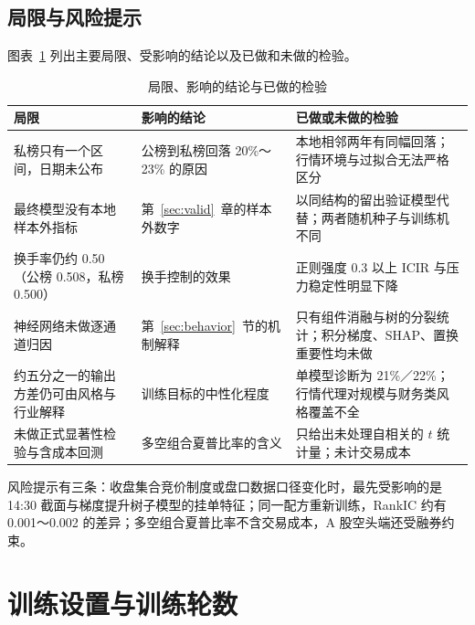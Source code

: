 \documentclass[UTF8,a4paper,zihao=-4,fontset=none]{ctexart}
\newcommand{\tabsetup}{\small\linespread{1.15}\selectfont\renewcommand{\arraystretch}{1.25}}
\newcommand{\figref}[1]{图表~\ref{#1}}
\begin{document}
\subsection{局限与风险提示}\label{sec:limits}

\figref{tab:limits} 列出主要局限、受影响的结论以及已做和未做的检验。

\begin{table}[htbp]
\caption{局限、影响的结论与已做的检验}\label{tab:limits}
\centering\tabsetup
\begin{tabularx}{\textwidth}{@{}>{\raggedright\arraybackslash\hsize=1.05\hsize}X>{\raggedright\arraybackslash\hsize=0.8\hsize}X>{\raggedright\arraybackslash\hsize=1.15\hsize}X@{}}
\toprule
局限 & 影响的结论 & 已做或未做的检验\\
\midrule
私榜只有一个区间，日期未公布 & 公榜到私榜回落 20\%～23\% 的原因 & 本地相邻两年有同幅回落；行情环境与过拟合无法严格区分\\
最终模型没有本地样本外指标 & 第~\ref{sec:valid}~章的样本外数字 & 以同结构的留出验证模型代替；两者随机种子与训练机不同\\
换手率仍约 0.50（公榜 0.508，私榜 0.500） & 换手控制的效果 & 正则强度 0.3 以上 ICIR 与压力稳定性明显下降\\
神经网络未做逐通道归因 & 第~\ref{sec:behavior}~节的机制解释 & 只有组件消融与树的分裂统计；积分梯度、SHAP、置换重要性均未做\\
约五分之一的输出方差仍可由风格与行业解释 & 训练目标的中性化程度 & 单模型诊断为 21\%／22\%；行情代理对规模与财务类风格覆盖不全\\
未做正式显著性检验与含成本回测 & 多空组合夏普比率的含义 & 只给出未处理自相关的 $t$ 统计量；未计交易成本\\
\bottomrule
\end{tabularx}
\end{table}

风险提示有三条：收盘集合竞价制度或盘口数据口径变化时，最先受影响的是 14:30 截面与梯度提升树子模型的挂单特征；同一配方重新训练，RankIC 约有 0.001～0.002 的差异；多空组合夏普比率不含交易成本，A 股空头端还受融券约束。

\newpage
\appendix
{}

\section{训练设置与训练轮数}\label{app:train}
\end{document}
